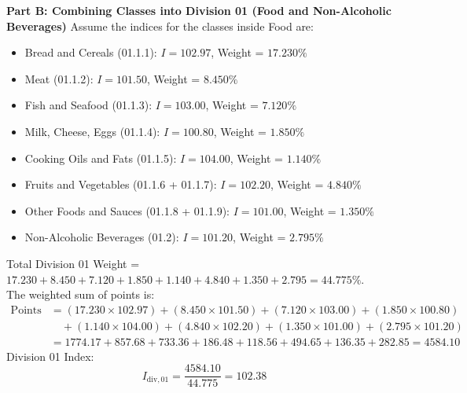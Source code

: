\documentclass[11pt,a4paper,oneside]{article}
\begin{document}
\begin{tcolorbox}[colback=white,colframe=NavyBlue,title=\textbf{Worked Arithmetic: Calculating the Food Division and Headline CPI}]
\textbf{Part B: Combining Classes into Division 01 (Food and Non-Alcoholic Beverages)}
Assume the indices for the classes inside Food are:
\begin{itemize}[noitemsep]
    \item Bread and Cereals (01.1.1): $I = 102.97$, Weight = $17.230\%$
    \item Meat (01.1.2): $I = 101.50$, Weight = $8.450\%$
    \item Fish and Seafood (01.1.3): $I = 103.00$, Weight = $7.120\%$
    \item Milk, Cheese, Eggs (01.1.4): $I = 100.80$, Weight = $1.850\%$
    \item Cooking Oils and Fats (01.1.5): $I = 104.00$, Weight = $1.140\%$
    \item Fruits and Vegetables (01.1.6 + 01.1.7): $I = 102.20$, Weight = $4.840\%$
    \item Other Foods and Sauces (01.1.8 + 01.1.9): $I = 101.00$, Weight = $1.350\%$
    \item Non-Alcoholic Beverages (01.2): $I = 101.20$, Weight = $2.795\%$
\end{itemize}
Total Division 01 Weight = $17.230 + 8.450 + 7.120 + 1.850 + 1.140 + 4.840 + 1.350 + 2.795 = \mathbf{44.775\%}$.\\
The weighted sum of points is:
\begin{align*}
\text{Points} &= (17.230 \times 102.97) + (8.450 \times 101.50) + (7.120 \times 103.00) + (1.850 \times 100.80) \\
&\quad + (1.140 \times 104.00) + (4.840 \times 102.20) + (1.350 \times 101.00) + (2.795 \times 101.20) \\
&= 1774.17 + 857.68 + 733.36 + 186.48 + 118.56 + 494.65 + 136.35 + 282.85 = \mathbf{4584.10}
\end{align*}
Division 01 Index:
$$I_{\text{div}, 01} = \frac{4584.10}{44.775} = \mathbf{102.38}$$


\end{tcolorbox}
\end{document}
